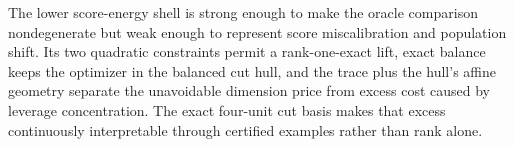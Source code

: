 The lower score-energy shell is strong enough to make the oracle comparison nondegenerate but weak enough to represent score miscalibration and population shift. Its two quadratic constraints permit a rank-one-exact lift, exact balance keeps the optimizer in the balanced cut hull, and the trace plus the hull's affine geometry separate the unavoidable dimension price from excess cost caused by leverage concentration. The exact four-unit cut basis makes that excess continuously interpretable through certified examples rather than rank alone.